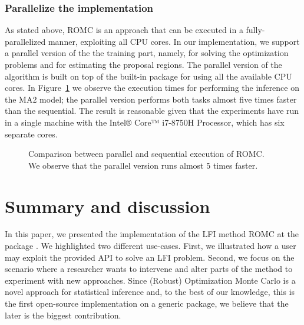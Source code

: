 \documentclass[article]{jss}
\begin{document}
\subsubsection*{Parallelize the implementation}

As stated above, ROMC is an approach that can be executed in a
fully-parallelized manner, exploiting all CPU cores. In our
implementation, we support a parallel version of the the training
part, namely, for solving the optimization problems and for estimating
the proposal regions. The parallel version of the algorithm is built
on top of the built-in  package 
for using all the available CPU cores. In
Figure~\ref{fig:exec_parallel} we observe the execution times for
performing the inference on the MA2 model; the parallel version
performs both tasks almost five times faster than the sequential. The
result is reasonable given that the experiments have run in a single
machine with the Intel® Core™ i7-8750H Processor, which has six
separate cores.


\begin{figure}[ht]
  \begin{center}
    \resizebox{.49\columnwidth}{!}{%
      
    }
    \resizebox{.49\columnwidth}{!}{%
      
    }
    \end{center}
    \caption[Execution time exploiting Parallelize]{Comparison
      between parallel and sequential execution of ROMC. We observe
      that the parallel version runs almost 5 times faster.}
      \label{fig:exec_parallel}
\end{figure}


\section{Summary and discussion} \label{sec:summary}

In this paper, we presented the implementation of the LFI method ROMC
at the  package . We highlighted two
different use-cases. First, we illustrated how a user may exploit the
provided API to solve an LFI problem. Second, we focus on the scenario
where a researcher wants to intervene and alter parts of the method to
experiment with new approaches. Since (Robust) Optimization Monte
Carlo is a novel approach for statistical inference and, to the best
of our knowledge, this is the first open-source implementation on a
generic package, we believe that the later is the biggest
contribution.
\end{document}
